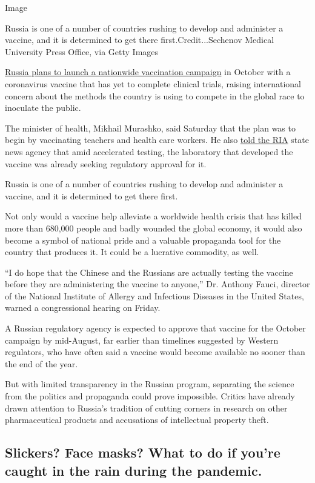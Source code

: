 Image

Russia is one of a number of countries rushing to develop and administer
a vaccine, and it is determined to get there first.Credit...Sechenov
Medical University Press Office, via Getty Images

\href{https://www.nytimes3xbfgragh.onion/2020/08/02/world/europe/russia-trials-vaccine-October.html}{Russia
plans to launch a nationwide vaccination campaign} in October with a
coronavirus vaccine that has yet to complete clinical trials, raising
international concern about the methods the country is using to compete
in the global race to inoculate the public.

The minister of health, Mikhail Murashko, said Saturday that the plan
was to begin by vaccinating teachers and health care workers. He also
\href{https://ria.ru/20200801/1575248763.html}{told the RIA} state news
agency that amid accelerated testing, the laboratory that developed the
vaccine was already seeking regulatory approval for it.

Russia is one of a number of countries rushing to develop and administer
a vaccine, and it is determined to get there first.

Not only would a vaccine help alleviate a worldwide health crisis that
has killed more than 680,000 people and badly wounded the global
economy, it would also become a symbol of national pride and a valuable
propaganda tool for the country that produces it. It could be a
lucrative commodity, as well.

``I do hope that the Chinese and the Russians are actually testing the
vaccine before they are administering the vaccine to anyone,'' Dr.
Anthony Fauci, director of the National Institute of Allergy and
Infectious Diseases in the United States, warned a congressional hearing
on Friday.

A Russian regulatory agency is expected to approve that vaccine for the
October campaign by mid-August, far earlier than timelines suggested by
Western regulators, who have often said a vaccine would become available
no sooner than the end of the year.

But with limited transparency in the Russian program, separating the
science from the politics and propaganda could prove impossible. Critics
have already drawn attention to Russia's tradition of cutting corners in
research on other pharmaceutical products and accusations of
intellectual property theft.

\hypertarget{slickers-face-masks-what-to-do-if-youre-caught-in-the-rain-during-the-pandemic}{%
\subsection{Slickers? Face masks? What to do if you're caught in the
rain during the
pandemic.}\label{slickers-face-masks-what-to-do-if-youre-caught-in-the-rain-during-the-pandemic}}

